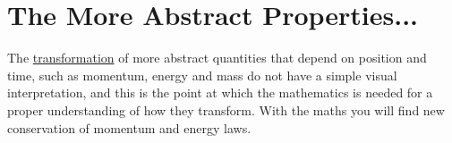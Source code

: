 

\section{The More Abstract Properties...}%

The \hyperlink{def-transform}{transformation} of more abstract quantities that depend on position and time, such as momentum, energy and mass do not have a simple visual interpretation, and this is the point at which the mathematics is needed for a proper understanding of how they transform. With the maths you will find new conservation of momentum and energy laws.






